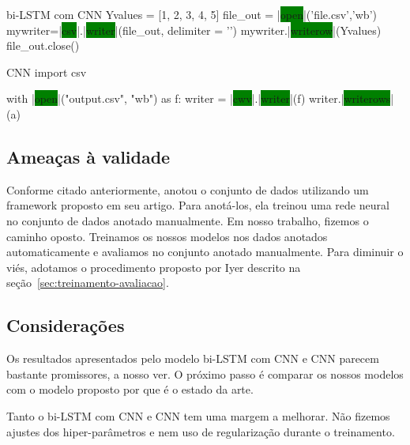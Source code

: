 \begin{tcolorbox}[colframe=orange!75!black,colback=gray!15!white,fonttitle=\bfseries,adjusted title=\large{Python and appending items to text and \colorbox{green}{excel} \colorbox{green}{file}}~\ref{foot:exemplo-resultados-preliminares},
enlarge top by=1cm%
]
\begin{mypython-without-margin}{bi-LSTM com CNN}
Yvalues = [1, 2, 3, 4, 5]
file_out = |\colorbox{green}{open}|('file.csv','wb')
mywriter=|\colorbox{green}{csv}|.|\colorbox{green}{writer}|(file_out, delimiter = '\n')
mywriter.|\colorbox{green}{writerow}|(Yvalues)
file_out.close()
\end{mypython-without-margin}

\begin{mypython-without-margin}{CNN}
import csv

with |\colorbox{green}{open}|("output.csv", "wb") as f:
    writer = |\colorbox{green}{cwv}|.|\colorbox{green}{writer}|(f)
    writer.|\colorbox{green}{writerows}|(a)
\end{mypython-without-margin}

\end{tcolorbox}



\subsection{Ameaças à validade}

Conforme citado anteriormente, \cite{yao-2018} anotou o conjunto de dados utilizando um framework proposto em seu artigo. Para anotá-los, ela treinou uma rede neural no conjunto de dados anotado manualmente. Em nosso trabalho, fizemos o caminho oposto. Treinamos os nossos modelos nos dados anotados automaticamente e avaliamos no conjunto anotado manualmente. Para diminuir o viés, adotamos o procedimento proposto por Iyer descrito na seção~\ref{sec:treinamento-avaliacao}.

\subsection{Considerações}

Os resultados apresentados pelo modelo bi-LSTM com CNN e CNN parecem bastante promissores, a nosso ver. O próximo passo é comparar os nossos modelos com o modelo proposto por \cite{Sachdev-neural-code-search:2018} que é o estado da arte. 

Tanto o bi-LSTM com CNN e CNN tem uma margem a melhorar. Não fizemos ajustes dos hiper-parâmetros e nem uso de regularização durante o treinamento.

